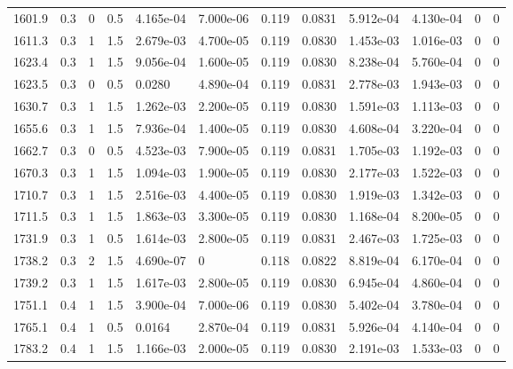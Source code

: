 \documentclass[preview]{standalone}
\begin{document}
{{{\begin{tabular}{L{1.2cm}C{1.2cm} C{0.3cm}C{0.5cm} C{1.4cm}C{1.4cm} C{1.4cm}C{1.4cm} C{1.6cm}C{1.6cm} C{1.6cm}C{1.6cm}}
  1601.9  &   0.3  & 0     & 0.5 &  4.165e-04  & 7.000e-06  &  0.119&   0.0831& 5.912e-04 & 4.130e-04   &  0 & 0  \\ 
  1611.3  &   0.3  & 1     & 1.5 &  2.679e-03  & 4.700e-05  &  0.119&   0.0830& 1.453e-03 & 1.016e-03   &  0 & 0  \\ 
  1623.4  &   0.3  & 1     & 1.5 &  9.056e-04  & 1.600e-05  &  0.119&   0.0830& 8.238e-04 & 5.760e-04   &  0 & 0  \\ 
  1623.5  &   0.3  & 0     & 0.5 &  0.0280  & 4.890e-04  &  0.119&   0.0831& 2.778e-03 & 1.943e-03   &  0 & 0  \\ 
  1630.7  &   0.3  & 1     & 1.5 &  1.262e-03  & 2.200e-05  &  0.119&   0.0830& 1.591e-03 & 1.113e-03   &  0 & 0  \\ 
  1655.6  &   0.3  & 1     & 1.5 &  7.936e-04  & 1.400e-05  &  0.119&   0.0830& 4.608e-04 & 3.220e-04   &  0 & 0  \\ 
  1662.7  &   0.3  & 0     & 0.5 &  4.523e-03  & 7.900e-05  &  0.119&   0.0831& 1.705e-03 & 1.192e-03   &  0 & 0  \\ 
  1670.3  &   0.3  & 1     & 1.5 &  1.094e-03  & 1.900e-05  &  0.119&   0.0830& 2.177e-03 & 1.522e-03   &  0 & 0  \\ 
  1710.7  &   0.3  & 1     & 1.5 &  2.516e-03  & 4.400e-05  &  0.119&   0.0830& 1.919e-03 & 1.342e-03   &  0 & 0  \\ 
  1711.5  &   0.3  & 1     & 1.5 &  1.863e-03  & 3.300e-05  &  0.119&   0.0830& 1.168e-04 & 8.200e-05   &  0 & 0  \\ 
  1731.9  &   0.3  & 1     & 0.5 &  1.614e-03  & 2.800e-05  &  0.119&   0.0831& 2.467e-03 & 1.725e-03   &  0 & 0  \\ 
  1738.2  &   0.3  & 2     & 1.5 &  4.690e-07  & 0  &  0.118&   0.0822& 8.819e-04 & 6.170e-04   &  0 & 0  \\ 
  1739.2  &   0.3  & 1     & 1.5 &  1.617e-03  & 2.800e-05  &  0.119&   0.0830& 6.945e-04 & 4.860e-04   &  0 & 0  \\ 
  1751.1  &   0.4  & 1     & 1.5 &  3.900e-04  & 7.000e-06  &  0.119&   0.0830& 5.402e-04 & 3.780e-04   &  0 & 0  \\ 
  1765.1  &   0.4  & 1     & 0.5 &  0.0164  & 2.870e-04  &  0.119&   0.0831& 5.926e-04 & 4.140e-04   &  0 & 0  \\ 
  1783.2  &   0.4  & 1     & 1.5 &  1.166e-03  & 2.000e-05  &  0.119&   0.0830& 2.191e-03 & 1.533e-03   &  0 & 0  \\ 
\hline 
\end{tabular} 

}}}
\end{document}
